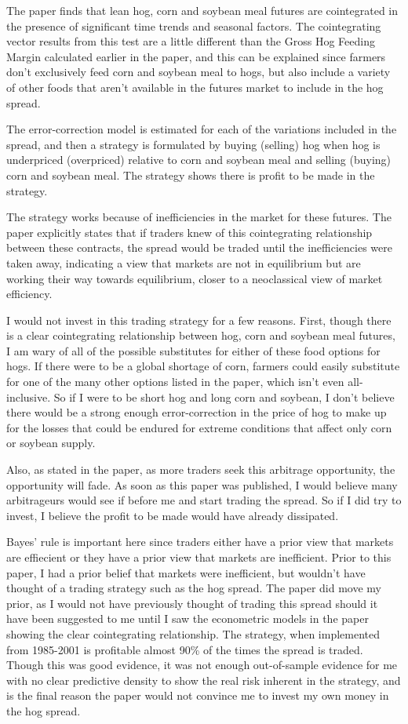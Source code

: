 \documentclass[11pt]{article}
\begin{document}
The paper finds that lean hog, corn and soybean meal futures are
cointegrated in the presence of significant time trends and seasonal
factors. The cointegrating vector results from this test are a little
different than the Gross Hog Feeding Margin calculated earlier in the
paper, and this can be explained since farmers don't exclusively feed
corn and soybean meal to hogs, but also include a variety of other foods
that aren't available in the futures market to include in the hog
spread.

The error-correction model is estimated for each of the variations
included in the spread, and then a strategy is formulated by buying
(selling) hog when hog is underpriced (overpriced) relative to corn and
soybean meal and selling (buying) corn and soybean meal. The strategy
shows there is profit to be made in the strategy.

The strategy works because of inefficiencies in the market for these
futures. The paper explicitly states that if traders knew of this
cointegrating relationship between these contracts, the spread would be
traded until the inefficiencies were taken away, indicating a view that
markets are not in equilibrium but are working their way towards
equilibrium, closer to a neoclassical view of market efficiency.

I would not invest in this trading strategy for a few reasons. First,
though there is a clear cointegrating relationship between hog, corn and
soybean meal futures, I am wary of all of the possible substitutes for
either of these food options for hogs. If there were to be a global
shortage of corn, farmers could easily substitute for one of the many
other options listed in the paper, which isn't even all-inclusive. So if
I were to be short hog and long corn and soybean, I don't believe there
would be a strong enough error-correction in the price of hog to make up
for the losses that could be endured for extreme conditions that affect
only corn or soybean supply.

Also, as stated in the paper, as more traders seek this arbitrage
opportunity, the opportunity will fade. As soon as this paper was
published, I would believe many arbitrageurs would see if before me and
start trading the spread. So if I did try to invest, I believe the
profit to be made would have already dissipated.

Bayes' rule is important here since traders either have a prior view
that markets are effiecient or they have a prior view that markets are
inefficient. Prior to this paper, I had a prior belief that markets were
inefficient, but wouldn't have thought of a trading strategy such as the
hog spread. The paper did move my prior, as I would not have previously
thought of trading this spread should it have been suggested to me until
I saw the econometric models in the paper showing the clear
cointegrating relationship. The strategy, when implemented from
1985-2001 is profitable almost 90\% of the times the spread is traded.
Though this was good evidence, it was not enough out-of-sample evidence
for me with no clear predictive density to show the real risk inherent
in the strategy, and is the final reason the paper would not convince me
to invest my own money in the hog spread.
\end{document}
